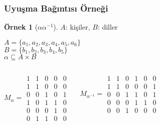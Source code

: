 \documentclass[dvipsnames]{beamer}
\theoremstyle{definition}
\theoremstyle{example}
\newtheorem{ornek}[theorem]{Örnek}
\theoremstyle{plain}
\begin{document}
\begin{frame}
  \frametitle{Uyuşma Bağıntısı Örneği}

  \begin{ornek}[$\alpha \alpha^{-1}$]
    $A$: kişiler, $B$: diller

    \medskip
    $A=\{a_1,a_2,a_3,a_4,a_5,a_6\}$\\
    $B=\{b_1,b_2,b_3,b_4,b_5\}$\\
    $\alpha \subseteq A \times B$

    \pause
    \begin{columns}
      \[
        M_\alpha =
          \begin{array}{|ccccc|}
            1  &  1  &  0  &  0  &  0\\
            1  &  1  &  0  &  0  &  0\\
            0  &  0  &  1  &  0  &  1\\
            1  &  0  &  1  &  1  &  0\\
            0  &  0  &  0  &  1  &  0\\
            0  &  1  &  1  &  0  &  0
          \end{array}
      \]

      \[
        M_{\alpha^{-1}} =
          \begin{array}{|cccccc|}
            1  &  1  &  0  &  1  &  0  &  0\\
            1  &  1  &  0  &  0  &  0  &  1\\
            0  &  0  &  1  &  1  &  0  &  1\\
            0  &  0  &  0  &  1  &  1  &  0\\
            0  &  0  &  1  &  0  &  0  &  0
          \end{array}
      \]
    \end{columns}
  \end{ornek}
\end{frame}
\end{document}
